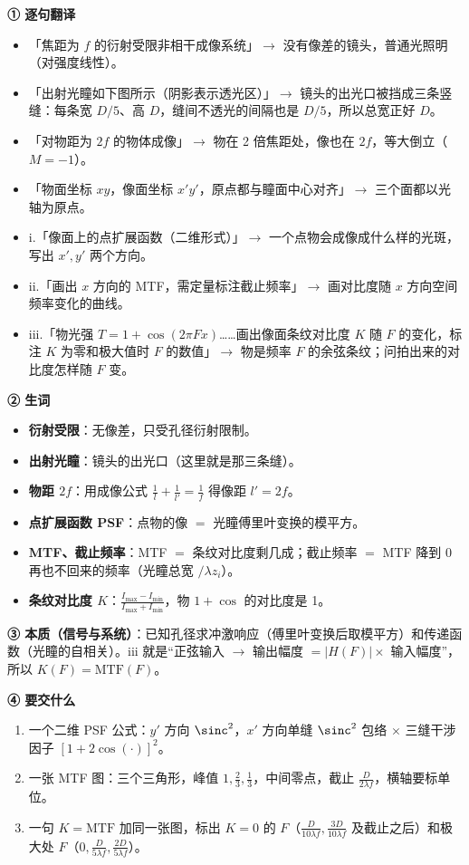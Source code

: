 \begin{idea}[读题：这道题在说什么]
\textbf{① 逐句翻译}
\begin{itemize}
\item 「焦距为 $f$ 的衍射受限非相干成像系统」$\to$ 没有像差的镜头，普通光照明（对强度线性）。
\item 「出射光瞳如下图所示（阴影表示透光区）」$\to$ 镜头的出光口被挡成三条竖缝：每条宽 $D/5$、高 $D$，缝间不透光的间隔也是 $D/5$，所以总宽正好 $D$。
\item 「对物距为 $2f$ 的物体成像」$\to$ 物在 2 倍焦距处，像也在 $2f$，等大倒立（$M=-1$）。
\item 「物面坐标 $xy$，像面坐标 $x'y'$，原点都与瞳面中心对齐」$\to$ 三个面都以光轴为原点。
\item i.「像面上的点扩展函数（二维形式）」$\to$ 一个点物会成像成什么样的光斑，写出 $x',y'$ 两个方向。
\item ii.「画出 $x$ 方向的 MTF，需定量标注截止频率」$\to$ 画对比度随 $x$ 方向空间频率变化的曲线。
\item iii.「物光强 $T=1+\cos(2\pi Fx)$……画出像面条纹对比度 $K$ 随 $F$ 的变化，标注 $K$ 为零和极大值时 $F$ 的数值」$\to$ 物是频率 $F$ 的余弦条纹；问拍出来的对比度怎样随 $F$ 变。
\end{itemize}
\textbf{② 生词}
\begin{itemize}
\item \textbf{衍射受限}：无像差，只受孔径衍射限制。
\item \textbf{出射光瞳}：镜头的出光口（这里就是那三条缝）。
\item \textbf{物距 $2f$}：用成像公式 $\frac1l+\frac1{l'}=\frac1f$ 得像距 $l'=2f$。
\item \textbf{点扩展函数 PSF}：点物的像 $=$ 光瞳傅里叶变换的模平方。
\item \textbf{MTF、截止频率}：MTF $=$ 条纹对比度剩几成；截止频率 $=$ MTF 降到 0 再也不回来的频率（光瞳总宽 $/\lambda z_i$）。
\item \textbf{条纹对比度 $K$}：$\frac{I_{\max}-I_{\min}}{I_{\max}+I_{\min}}$，物 $1+\cos$ 的对比度是 1。
\end{itemize}
\textbf{③ 本质（信号与系统）}：已知孔径求冲激响应（傅里叶变换后取模平方）和传递函数（光瞳的自相关）。iii 就是“正弦输入 $\to$ 输出幅度 $=|H(F)|\times$ 输入幅度”，所以 $K(F)=\mathrm{MTF}(F)$。

\textbf{④ 要交什么}
\begin{enumerate}[label=\roman*.]
\item 一个二维 PSF 公式：$y'$ 方向 $\sinc^2$，$x'$ 方向单缝 $\sinc^2$ 包络 $\times$ 三缝干涉因子 $[1+2\cos(\cdot)]^2$。
\item 一张 MTF 图：三个三角形，峰值 $1,\frac23,\frac13$，中间零点，截止 $\frac{D}{2\lambda f}$，横轴要标单位。
\item 一句 $K=\mathrm{MTF}$ 加同一张图，标出 $K=0$ 的 $F$（$\frac{D}{10\lambda f},\frac{3D}{10\lambda f}$ 及截止之后）和极大处 $F$（$0,\frac{D}{5\lambda f},\frac{2D}{5\lambda f}$）。
\end{enumerate}
\end{idea}

